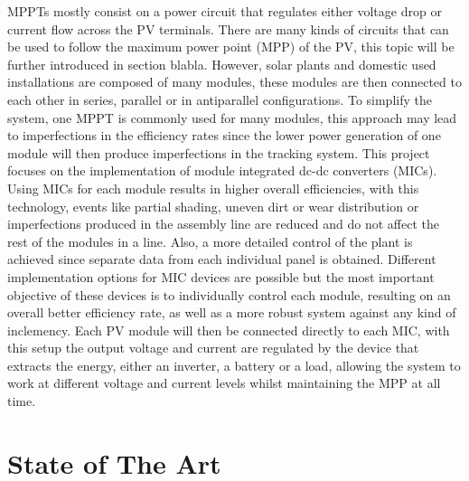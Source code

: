 MPPTs mostly consist on a power circuit that regulates either voltage drop or current flow across the PV terminals. There are many kinds of circuits that can be used to follow the maximum power point (MPP) of the PV, this topic will be further introduced in section blabla. 
However, solar plants and domestic used installations are composed of many modules, these modules are then connected to each other in series, parallel or in antiparallel configurations. To simplify the system, one MPPT is commonly used for many modules, this approach may lead to imperfections in the efficiency rates since the lower power generation of one module will then produce imperfections in the tracking system. 
This project focuses on the implementation of module integrated dc-dc converters (MICs). Using MICs for each module results in higher overall efficiencies, with this technology, events like partial shading, uneven dirt or wear distribution or imperfections produced in the assembly line are reduced and do not affect the rest of the modules in a line. Also, a more detailed control of the plant is achieved since separate data from each individual panel is obtained.
Different implementation options for MIC devices are possible but the most important objective of these devices is to individually control each module, resulting on an overall better efficiency rate, as well as a more robust system against any kind of inclemency. Each PV module will then be connected directly to each MIC, with this setup the output voltage and current are regulated by the device that extracts the energy, either an inverter, a battery or a load, allowing the system to work at different voltage and current levels whilst maintaining the MPP at all time.

\section{State of The Art}




